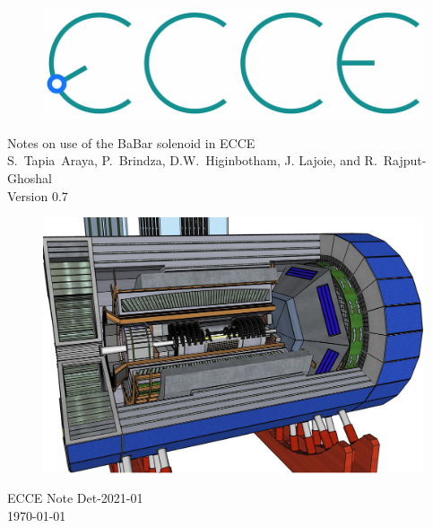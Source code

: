 \renewcommand*\familydefault{\sfdefault}
{\sffamily
\vfill
\vspace{4cm}
\begin{figure}[H]
  \begin{center}
  \includegraphics[width=0.3\linewidth]{figs/ecce-logo.png}
\end{center}
\end{figure}

\vspace{2mm}

\begin{center}
  \large
{\LARGE{Notes on use of the BaBar solenoid in ECCE}} \\
\vspace{0.25cm}
S.~Tapia~Araya, P.~Brindza, D.W.~Higinbotham, J. Lajoie, and R.~Rajput-Ghoshal
\\
Version 0.7
\\
\end{center}


\vfill
\begin{figure}[H]
  \begin{center}
    \includegraphics[width=0.7\linewidth]{figs/ECCE.png}
  \end{center}
\end{figure}
}
\vspace{2.5cm}

\begin{center}
{\LARGE{ECCE Note Det-2021-01}} \\
\vspace{2mm}
{\large{\today}}
\end{center}
\renewcommand*\familydefault{\rmdefault}
